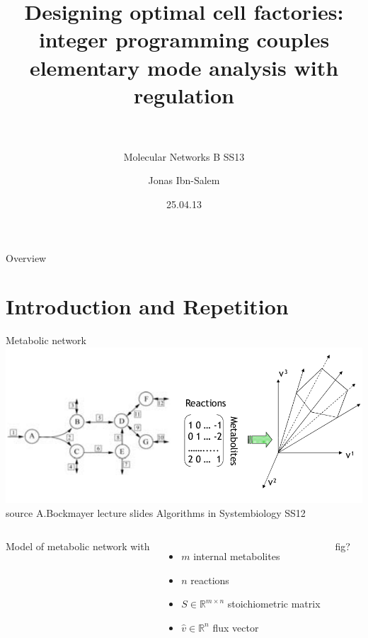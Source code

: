 \documentclass{beamer}
\title[Elementary flux mode analysis]{Designing optimal cell factories: integer programming couples elementary mode analysis with regulation\\~\\}
\subtitle{Molecular Networks B SS13}
\author[Jonas Ibn-Salem]{Jonas Ibn-Salem}
\institute[]{}
\date{25.04.13}
\begin{document}
\maketitle



\begin{frame}{Overview}
    \tableofcontents
\end{frame}

\section{Introduction and Repetition}
\begin{frame}{Metabolic network}
    \includegraphics[width=\textwidth]{grafik/modelling} \\
    \footnotesize{
        source A.Bockmayer lecture slides Algorithms in Systembiology SS12
        }
    \begin{columns}
        Model of metabolic network with
        \begin{itemize}
            \item $m$ internal metabolites
            \item $n$ reactions
            \item $S \in \mathbb{R}^{m\times n}$ stoichiometric matrix
            \item $\hat{v} \in \mathbb{R}^{n}$ flux vector
        \end{itemize}
        fig?
    \end{columns}
\end{frame}
\end{document}
